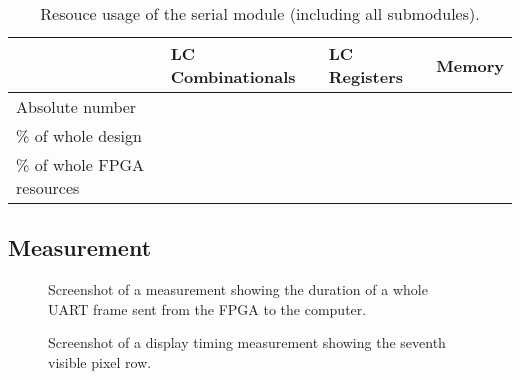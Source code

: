 \documentclass[12pt,a4paper,titlepage,oneside]{article}
\begin{document}
\begin{table}[ht!]
  \centering
  \caption{Resouce usage of the serial module (including all submodules).}
  \begin{tabular}{|l|l|l|l|}
    \hline
    & LC Combinationals & LC Registers & Memory      \\ \hline 
    Absolute number      &                   &              &             \\
    \% of whole design   &                   &              &             \\
    \% of whole FPGA resources &                   &              &             \\ \hline
  \end{tabular}
\end{table}

\subsection*{Measurement}

\begin{figure}[ht!]
  \centering
  
  \caption{Screenshot of a measurement showing the duration of a whole UART
    frame sent from the FPGA to the computer.}
\end{figure}

\begin{qa}
\end{qa}

\begin{figure}[ht!]
  \centering
  
  \caption{Screenshot of a display timing measurement showing the seventh visible pixel row.}
\end{figure}
\end{document}
